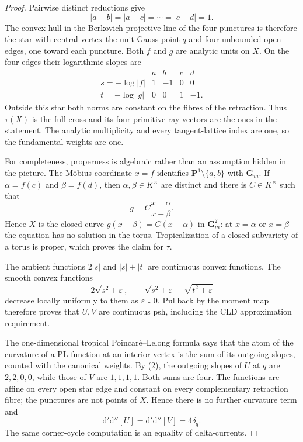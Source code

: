 \begin{proof}
Pairwise distinct reductions give
\[
 |a-b|=|a-c|=\cdots=|c-d|=1.
\tag{1}
\]
The convex hull in the Berkovich projective line of the four punctures is
therefore the star with central vertex the unit Gauss point $q$ and four
unbounded open edges, one toward each puncture.  Both $f$ and $g$ are
analytic units on $X$.  On the four edges their logarithmic slopes are
\[
\begin{array}{c|rrrr}
 &a&b&c&d\\ \hline
s=-\log|f|& 1&-1&0&0\\
t=-\log|g|& 0&0&1&-1.
\end{array}
\tag{2}
\]
Outside this star both norms are constant on the fibres of the retraction.
Thus $\tau(X)$ is the full cross and its four primitive ray vectors are the
ones in the statement.  The analytic multiplicity and every tangent-lattice
index are one, so the fundamental weights are one.

For completeness, properness is algebraic rather than an assumption hidden
in the picture.  The M\"obius coordinate $x=f$ identifies
$\mathbf P^1\setminus\{a,b\}$ with $\mathbf G_m$.  If
$\alpha=f(c)$ and $\beta=f(d)$, then $\alpha,\beta\in K^\times$ are
distinct and there is $C\in K^\times$ such that
\[
                         g=C\frac{x-\alpha}{x-\beta}.
\tag{3}
\]
Hence $X$ is the closed curve
$g(x-\beta)=C(x-\alpha)$ in $\mathbf G_m^2$: at $x=\alpha$ or
$x=\beta$ the equation has no solution in the torus.  Tropicalization of a
closed subvariety of a torus is proper, which proves the claim for $\tau$.

The ambient functions $2|s|$ and $|s|+|t|$ are continuous convex
functions.  The smooth convex functions
\[
 2\sqrt{s^2+\varepsilon},\qquad
 \sqrt{s^2+\varepsilon}+\sqrt{t^2+\varepsilon}
\]
decrease locally uniformly to them as $\varepsilon\downarrow0$.  Pullback
by the moment map therefore proves that $U,V$ are continuous psh, including
the CLD approximation requirement.

The one-dimensional tropical Poincar\'e--Lelong formula says that the atom
of the curvature of a PL function at an interior vertex is the sum of its
outgoing slopes, counted with the canonical weights.  By (2), the outgoing
slopes of $U$ at $q$ are $2,2,0,0$, while those of $V$ are $1,1,1,1$.
Both sums are four.  The functions are affine on every open star edge and
constant on every complementary retraction fibre; the punctures are not
points of $X$.  Hence there is no further curvature term and
\[
             \mathrm d'\mathrm d''[U]
             =\mathrm d'\mathrm d''[V]=4\delta_q.
\tag{4}
\]
The same corner-cycle computation is an equality of delta-currents.


\end{proof}
